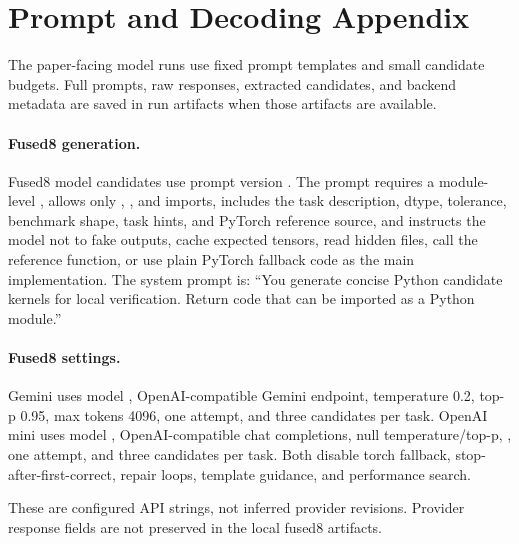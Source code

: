 \section{Prompt and Decoding Appendix}
\begingroup
\footnotesize

The paper-facing model runs use fixed prompt templates and small candidate budgets. Full prompts, raw responses, extracted candidates, and backend metadata are saved in run artifacts when those artifacts are available.

\paragraph{Fused8 generation.}
Fused8 model candidates use prompt version . The prompt requires a module-level , allows only , , and  imports, includes the task description, dtype, tolerance, benchmark shape, task hints, and PyTorch reference source, and instructs the model not to fake outputs, cache expected tensors, read hidden files, call the reference function, or use plain PyTorch fallback code as the main implementation. The system prompt is: ``You generate concise Python candidate kernels for local verification. Return code that can be imported as a Python module.''

\paragraph{Fused8 settings.}
Gemini uses model , OpenAI-compatible Gemini endpoint, temperature 0.2, top-p 0.95, max tokens 4096, one attempt, and three candidates per task. OpenAI mini uses model , OpenAI-compatible chat completions, null temperature/top-p, , one attempt, and three candidates per task. Both disable torch fallback, stop-after-first-correct, repair loops, template guidance, and performance search.

These are configured API strings, not inferred provider revisions. Provider response  fields are not preserved in the local fused8 artifacts.

